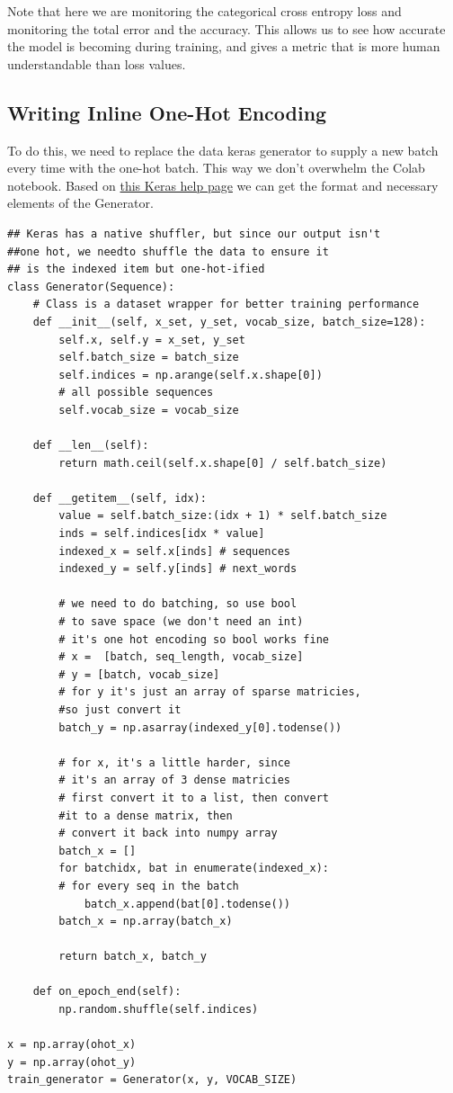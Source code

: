 \documentclass{article}
\begin{document}
Note that here we are monitoring the categorical cross entropy loss and monitoring the total error and the accuracy. This allows us to see how accurate the model is becoming during training, and gives a metric that is more human understandable than loss values.


\subsection{Writing Inline One-Hot Encoding}

To do this, we need to replace the data keras generator to supply a new batch every time with the one-hot batch. This way we don't overwhelm the Colab notebook. Based on \href{https://github.com/keras-team/keras/issues/9707}{this Keras help page} we can get the format and necessary elements of the Generator.

\begin{verbatim}
## Keras has a native shuffler, but since our output isn't 
##one hot, we needto shuffle the data to ensure it 
## is the indexed item but one-hot-ified 
class Generator(Sequence):
    # Class is a dataset wrapper for better training performance
    def __init__(self, x_set, y_set, vocab_size, batch_size=128):
        self.x, self.y = x_set, y_set
        self.batch_size = batch_size
        self.indices = np.arange(self.x.shape[0]) 
        # all possible sequences
        self.vocab_size = vocab_size

    def __len__(self):
        return math.ceil(self.x.shape[0] / self.batch_size)

    def __getitem__(self, idx):
        value = self.batch_size:(idx + 1) * self.batch_size
        inds = self.indices[idx * value]
        indexed_x = self.x[inds] # sequences
        indexed_y = self.y[inds] # next_words

        # we need to do batching, so use bool 
        # to save space (we don't need an int)
        # it's one hot encoding so bool works fine
        # x =  [batch, seq_length, vocab_size]
        # y = [batch, vocab_size] 
        # for y it's just an array of sparse matricies,
        #so just convert it
        batch_y = np.asarray(indexed_y[0].todense())

        # for x, it's a little harder, since 
        # it's an array of 3 dense matricies
        # first convert it to a list, then convert 
        #it to a dense matrix, then 
        # convert it back into numpy array
        batch_x = []
        for batchidx, bat in enumerate(indexed_x): 
        # for every seq in the batch
            batch_x.append(bat[0].todense())
        batch_x = np.array(batch_x) 

        return batch_x, batch_y
    
    def on_epoch_end(self):
        np.random.shuffle(self.indices)

x = np.array(ohot_x)
y = np.array(ohot_y)
train_generator = Generator(x, y, VOCAB_SIZE)
\end{verbatim}
\end{document}
